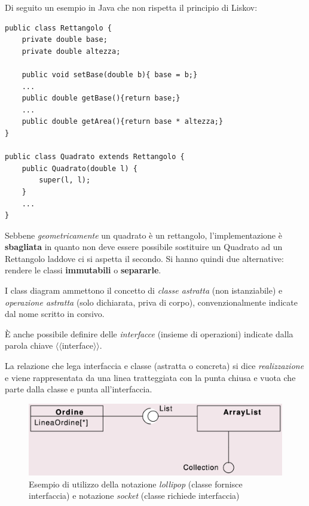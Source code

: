 \newpage
Di seguito un esempio in Java che non rispetta il principio di Liskov:
\begin{verbatim}
public class Rettangolo {
    private double base;
    private double altezza;

    public void setBase(double b){ base = b;}
    ...
    public double getBase(){return base;}
    ...
    public double getArea(){return base * altezza;}
}

public class Quadrato extends Rettangolo {
    public Quadrato(double l) {
        super(l, l);
    }
    ...
}
\end{verbatim}
Sebbene \textit{geometricamente} un quadrato è un rettangolo, l'implementazione è \textbf{sbagliata} in quanto non deve essere possibile sostituire un Quadrato ad un Rettangolo laddove ci si aspetta il secondo. Si hanno quindi due alternative: rendere le classi \textbf{immutabili} o \textbf{separarle}.

I class diagram ammettono il concetto di \textit{classe astratta} (non istanziabile) e \textit{operazione astratta} (solo dichiarata, priva di corpo), convenzionalmente indicate dal nome scritto in corsivo.

È anche possibile definire delle \textit{interfacce} (insieme di operazioni) indicate dalla parola chiave $\langle\langle$interface$\rangle\rangle$.

La relazione che lega interfaccia e classe (astratta o concreta) si dice \textit{realizzazione} e viene rappresentata da una linea tratteggiata con la punta chiusa e vuota che parte dalla classe e punta all'interfaccia.

\begin{figure}[h!]
    \centering
    \includegraphics[width=0.75\linewidth]{assets/UML/class/class-9.png}
    \caption{Esempio di utilizzo della notazione \textit{lollipop} (classe fornisce interfaccia) e notazione \textit{socket} (classe richiede interfaccia)}
\end{figure}

